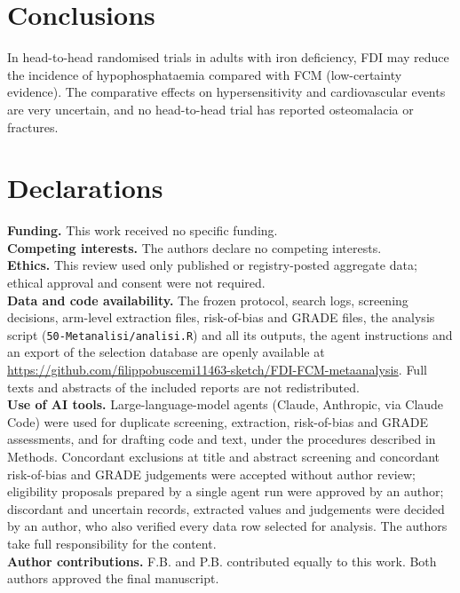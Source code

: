 \documentclass[11pt,a4paper]{article}
\begin{document}
\section{Conclusions}
In head-to-head randomised trials in adults with iron deficiency, FDI may reduce the incidence of hypophosphataemia compared with FCM (low-certainty evidence). The comparative effects on hypersensitivity and cardiovascular events are very uncertain, and no head-to-head trial has reported osteomalacia or fractures.

\section*{Declarations}
\noindent\textbf{Funding.} This work received no specific funding.\\
\textbf{Competing interests.} The authors declare no competing interests.\\
\textbf{Ethics.} This review used only published or registry-posted aggregate data; ethical approval and consent were not required.\\
\textbf{Data and code availability.} The frozen protocol, search logs, screening decisions, arm-level extraction files, risk-of-bias and GRADE files, the analysis script (\texttt{50-Metanalisi/analisi.R}) and all its outputs, the agent instructions and an export of the selection database are openly available at \url{https://github.com/filippobuscemi11463-sketch/FDI-FCM-metaanalysis}. Full texts and abstracts of the included reports are not redistributed.\\
\textbf{Use of AI tools.} Large-language-model agents (Claude, Anthropic, via Claude Code) were used for duplicate screening, extraction, risk-of-bias and GRADE assessments, and for drafting code and text, under the procedures described in Methods. Concordant exclusions at title and abstract screening and concordant risk-of-bias and GRADE judgements were accepted without author review; eligibility proposals prepared by a single agent run were approved by an author; discordant and uncertain records, extracted values and judgements were decided by an author, who also verified every data row selected for analysis. The authors take full responsibility for the content.\\
\textbf{Author contributions.} F.B. and P.B. contributed equally to this work. Both authors approved the final manuscript.



\end{document}
